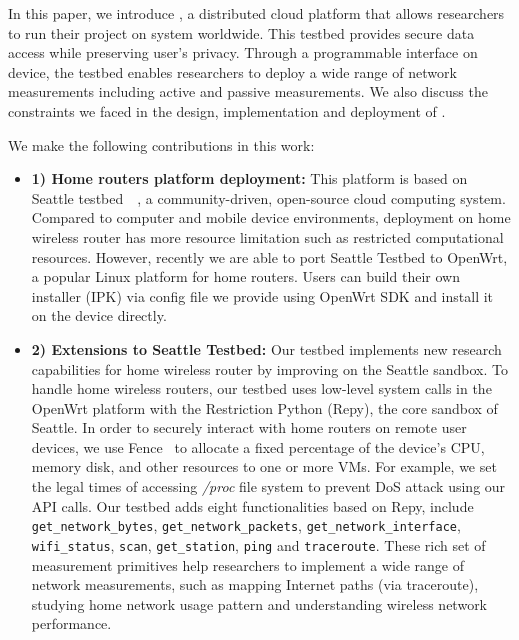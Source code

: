 In this paper, we introduce \sysname, a distributed cloud platform that allows researchers to run their project on system worldwide. This testbed provides secure data access while preserving user's privacy. Through a programmable interface on device, the testbed enables researchers to deploy a wide range of network measurements including active and passive measurements. We also discuss the constraints we faced in the design, implementation and deployment of \sysname. 

We make the following contributions in this work:
{\raggedright
\begin{itemize}
\item\textbf{1) Home routers platform deployment:} This platform is based on Seattle testbed~\cite{zhuang2013experience}~\cite{cappos2009seattle}, a community-driven, open-source cloud computing system. Compared to computer and mobile device environments, deployment on home wireless router has more resource limitation such as restricted computational resources. However, recently we are able to port Seattle Testbed to OpenWrt, a popular Linux platform for home routers\cite{openwrt}. Users can build their own \sysname installer (IPK) via config file we provide using OpenWrt SDK and install it on the device directly. 

\item\textbf{2) Extensions to Seattle Testbed:}  Our testbed implements new research capabilities for home wireless router by improving on the Seattle sandbox. To handle home wireless routers, our testbed uses low-level system calls in the OpenWrt platform with the Restriction Python (Repy)\cite{cappos2010retaining}, the core sandbox of Seattle. In order to securely interact with home routers on remote user devices, we use Fence~\cite{li2015fence} to allocate a fixed percentage of the device's CPU, memory disk, and other resources to one or more VMs. For example, we set the legal times of accessing \emph{/proc} file system to prevent DoS attack using our API calls. Our testbed adds eight functionalities based on Repy, include \texttt{get\_network\_bytes}, \texttt{get\_network\_packets}, \texttt{get\_network\_interface}, \texttt{wifi\_status}, \texttt{scan}, \texttt{get\_station}, \texttt{ping} and \texttt{traceroute}. These rich set of measurement primitives help researchers to implement a wide range of network measurements, such as mapping Internet paths (via traceroute), studying home network usage pattern and understanding wireless network performance.


\end{itemize}}
